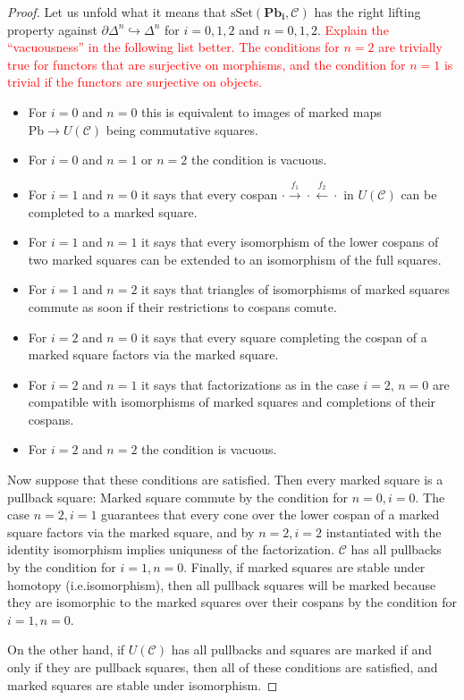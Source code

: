 \documentclass[a4paper]{article}
\newcommand{\todo}[1]{\textcolor{red}{#1}}
\theoremstyle{remark}
\theoremstyle{definition}
\begin{document}
\begin{proof}
  Let us unfold what it means that $\mathrm{sSet}(\mathbf{Pb_i}, \mathcal{C})$ has the right lifting property against $\partial \Delta^n \hookrightarrow \Delta^n$ for $i = 0, 1, 2$ and $n = 0, 1, 2$.
  \todo{
    Explain the ``vacuousness'' in the following list better.
    The conditions for $n = 2$ are trivially true for functors that are surjective on morphisms, and the condition for $n = 1$ is trivial if the functors are surjective on objects.
  }
  \begin{itemize}
    \item
      For $i = 0$ and $n = 0$ this is equivalent to images of marked maps $\mathrm{Pb} \rightarrow U(\mathcal{C})$ being commutative squares.
    \item
      For $i = 0$ and $n = 1$ or $n = 2$ the condition is vacuous.
    \item
      For $i = 1$ and $n = 0$ it says that every cospan $\cdot \xrightarrow{f_1} \cdot \xleftarrow{f_2} \cdot$ in $U(\mathcal{C})$ can be completed to a marked square.
    \item
      For $i = 1$ and $n = 1$ it says that every isomorphism of the lower cospans of two marked squares can be extended to an isomorphism of the full squares.
    \item
      For $i = 1$ and $n = 2$ it says that triangles of isomorphisms of marked squares commute as soon if their restrictions to cospans comute.
    \item
      For $i = 2$ and $n = 0$ it says that every square completing the cospan of a marked square factors via the marked square.
    \item
      For $i = 2$ and $n = 1$ it says that factorizations as in the case $i = 2$, $n = 0$ are compatible with isomorphisms of marked squares and completions of their cospans.
    \item
      For $i = 2$ and $n = 2$ the condition is vacuous.
  \end{itemize}
  Now suppose that these conditions are satisfied.
  Then every marked square is a pullback square:
  Marked square commute by the condition for $n = 0, i = 0$.
  The case $n = 2, i = 1$ guarantees that every cone over the lower cospan of a marked square factors via the marked square, and by $n = 2, i = 2$ instantiated with the identity isomorphism implies uniquness of the factorization.
  $\mathcal{C}$ has all pullbacks by the condition for $i = 1, n = 0$.
  Finally, if marked squares are stable under homotopy (i.e.\@ isomorphism), then all pullback squares will be marked because they are isomorphic to the marked squares over their cospans by the condition for $i = 1, n = 0$.

  On the other hand, if $U(\mathcal{C})$ has all pullbacks and squares are marked if and only if they are pullback squares, then all of these conditions are satisfied, and marked squares are stable under isomorphism.
\end{proof}
\end{document}
